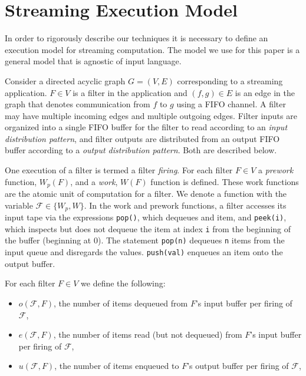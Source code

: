 \section{Streaming Execution Model}

In order to rigorously describe our techniques it is necessary to
define an execution model for streaming computation. The model we use
for this paper is a general model that is agnostic of input language.

Consider a directed acyclic graph $G = (V, E)$ corresponding to a
streaming application. $F \in V$ is a filter in the application and
$(f, g) \in E$ is an edge in the graph that denotes communication from
$f$ to $g$ using a FIFO channel.  A filter may have multiple incoming
edges and multiple outgoing edges.  Filter inputs are organized into a
single FIFO buffer for the filter to read according to an {\it input
distribution pattern}, and filter outputs are distributed from an
output FIFO buffer according to a {\it output distribution pattern}.  Both
are described below.

One execution of a filter is termed a filter {\it firing}. For each
filter $F \in V$ a {\it prework} function, $W_p(F)$, and a {\it work},
$W(F)$ function is defined.  These work functions are the atomic unit
of computation for a filter.  We denote a function with the variable
$\mathcal{F} \in \{W_p, W\}$.  In the work and prework functions, a
filter accesses its input tape via the expressions {\tt pop()}, which
dequeues and item, and {\tt peek(i)}, which inspects but does not
dequeue the item at index {\tt i} from the beginning of the buffer
(beginning at 0).  The statement {\tt pop(n)} dequeues {\tt n} items
from the input queue and disregards the values.  {\tt push(val)}
enqueues an item onto the output buffer.

For each filter $F \in V$ we define the following:
\begin{itemize}

\item $o(\mathcal{F}, F)$, the number of items dequeued from $F$'s
input buffer per firing of $\mathcal{F}$,

\item $e(\mathcal{F}, F)$, the number of items read (but not dequeued)
from $F$'s input buffer per firing of $\mathcal{F}$,

\item $u(\mathcal{F}, F)$, the number of items enqueued to $F$'s
output buffer per firing of $\mathcal{F}$,

\end{itemize}

